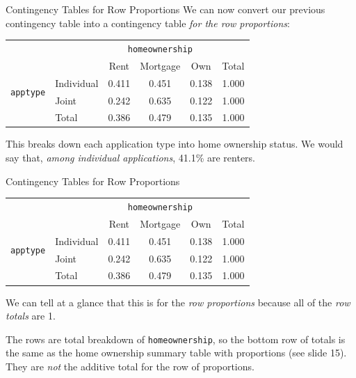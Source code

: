 \begin{frame}{Contingency Tables for Row Proportions}
    We can now convert our previous contingency table into a contingency table \textit{for the row proportions}:
    \begin{center}
        \begin{tabular}{r l ccc r}
		& & \multicolumn{3}{c}{{\texttt{homeownership}}} & \\
        \cline{3-5}
		& & Rent & Mortgage & Own & Total  \\ 
        \cline{2-6}
        \multirow{2}{*}{{\texttt{apptype}}} 
        & Individual & 0.411 & 0.451 & 0.138 & 1.000 \\ 
  		& Joint & 0.242 & 0.635 & 0.122 & 1.000 \\ 
        \cline{2-6}
  		& Total	& 0.386 & 0.479 & 0.135 & 1.000 \\
        \cline{2-6}
    \end{tabular}
    \end{center}
    
    \vspace{12pt}This breaks down each application type into home ownership status. We would say that, \textit{among individual applications}, 41.1\% are renters. 
\end{frame}

\begin{frame}{Contingency Tables for Row Proportions}
    \begin{center}
        \begin{tabular}{r l ccc r}
		& & \multicolumn{3}{c}{{\texttt{homeownership}}} & \\
        \cline{3-5}
		& & Rent & Mortgage & Own & Total  \\ 
        \cline{2-6}
        \multirow{2}{*}{{\texttt{apptype}}} 
        & Individual & 0.411 & 0.451 & 0.138 & 1.000 \\ 
  		& Joint & 0.242 & 0.635 & 0.122 & 1.000 \\ 
        \cline{2-6}
  		& Total	& 0.386 & 0.479 & 0.135 & 1.000 \\
        \cline{2-6}
    \end{tabular}
    \end{center}
    We can tell at a glance that this is for the \textit{row proportions} because all of the \textit{row totals} are 1. 
    
    \vspace{12pt}The rows are total breakdown of \texttt{homeownership}, so the bottom row of totals is the same as the home ownership summary table with proportions (see slide 15). They are \textit{not} the additive total for the row of proportions.
\end{frame}


